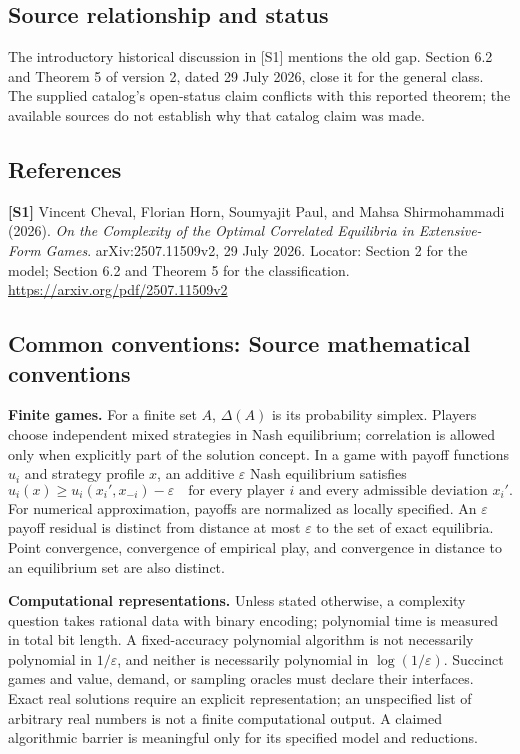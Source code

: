 \documentclass[11pt,a4paper]{article}
\begin{document}
\subsection*{Source relationship and status}
The introductory historical discussion in [S1] mentions the old gap. Section 6.2 and Theorem 5 of version 2, dated 29 July 2026, close it for the general class. The supplied catalog's open-status claim conflicts with this reported theorem; the available sources do not establish why that catalog claim was made.
\subsection*{References}
\begingroup\footnotesize\raggedright
{\footnotesize\raggedright
\textbf{[S1]} Vincent Cheval, Florian Horn, Soumyajit Paul, and Mahsa Shirmohammadi (2026). \emph{On the Complexity of the Optimal Correlated Equilibria in Extensive-Form Games}. arXiv:2507.11509v2, 29 July 2026. Locator: Section 2 for the model; Section 6.2 and Theorem 5 for the classification. \url{https://arxiv.org/pdf/2507.11509v2}\par}
\par\endgroup

\subsection*{Common conventions: Source mathematical conventions}

\textbf{Finite games.} For a finite set $A$, $\Delta(A)$ is its probability
simplex. Players choose independent mixed strategies in Nash equilibrium;
correlation is allowed only when explicitly part of the solution concept.
In a game with payoff functions $u_i$ and strategy profile $x$, an additive
$\varepsilon$ Nash equilibrium satisfies
\[
 u_i(x)\geq u_i(x_i',x_{-i})-\varepsilon
 \quad\text{for every player $i$ and every admissible deviation $x_i'$}.
\]
For numerical approximation, payoffs are normalized as locally specified.
An $\varepsilon$ payoff residual is distinct from distance at most
$\varepsilon$ to the set of exact equilibria. Point convergence, convergence
of empirical play, and convergence in distance to an equilibrium set are
also distinct.

\textbf{Computational representations.} Unless stated otherwise, a complexity
question takes rational data with binary encoding; polynomial time is measured
in total bit length. A fixed-accuracy polynomial algorithm is not necessarily
polynomial in $1/\varepsilon$, and neither is necessarily polynomial in
$\log(1/\varepsilon)$. Succinct games and value, demand, or sampling oracles
must declare their interfaces. Exact real solutions require an explicit
representation; an unspecified list of arbitrary real numbers is not a
finite computational output. A claimed algorithmic barrier is meaningful
only for its specified model and reductions.
\end{document}
